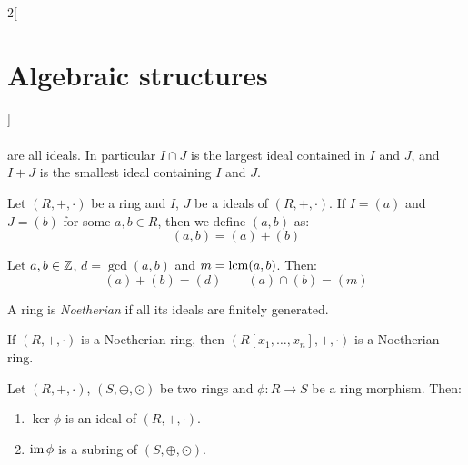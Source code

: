 \documentclass[../../../main.tex]{subfiles}
\begin{document}
\begin{multicols}{2}[\section{Algebraic structures}]
\begin{prop}
\begin{gather*}
    \end{gather*}
    are all ideals. In particular $I\cap J$ is the largest ideal contained in $I$ and $J$, and $I+J$ is the smallest ideal containing $I$ and $J$.
\end{prop}
\begin{definition}
    Let $(R,+,\cdot)$ be a ring and $I$, $J$ be a ideals of $(R,+,\cdot)$. If $I=(a)$ and $J=(b)$ for some $a,b\in R$, then we define $(a,b)$ as: $$(a,b)=(a)+(b)$$
\end{definition}
\begin{prop}
    Let $a,b\in\mathbb{Z}$, $d=\gcd(a,b)$ and $m=\operatorname{lcm}(a,b)$. Then: $$(a)+(b)=(d)\qquad(a)\cap(b)=(m)$$
\end{prop}
\begin{definition}
    A ring is \textit{Noetherian} if all its ideals are finitely generated.
\end{definition}
\begin{theorem}
    If $(R,+,\cdot)$ is a Noetherian ring, then $(R[x_1,\ldots,x_n],+,\cdot)$ is a Noetherian ring.
\end{theorem}
\begin{lemma}
    Let $(R,+,\cdot)$, $(S,\oplus,\odot)$ be two rings and $\phi:R\rightarrow S$ be a ring morphism. Then:
    \begin{enumerate}
        \item $\ker\phi$ is an ideal of $(R,+,\cdot)$.
        \item $\operatorname{im}\phi$ is a subring of $(S,\oplus,\odot)$.
    \end{enumerate}
\end{lemma}

\end{multicols}
\end{document}
